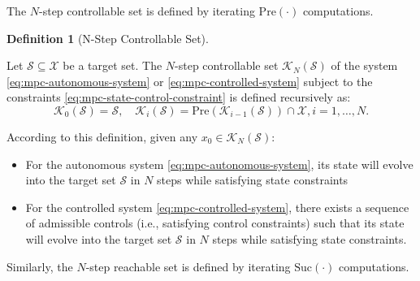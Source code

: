 \documentclass[
]{book}
\theoremstyle{definition}
\newtheorem{definition}{Definition}[chapter]
\theoremstyle{definition}
\theoremstyle{definition}
\theoremstyle{definition}
\theoremstyle{remark}
\begin{document}
The \(N\)-step controllable set is defined by iterating \(\text{Pre}(\cdot)\) computations.

\begin{definition}[N-Step Controllable Set]
\protect\hypertarget{def:controllable-set}{}\label{def:controllable-set}

Let \(\mathcal{S} \subseteq \mathcal{X}\) be a target set. The \(N\)-step controllable set \(\mathcal{K}_{N}(\mathcal{S})\) of the system \eqref{eq:mpc-autonomous-system} or \eqref{eq:mpc-controlled-system} subject to the constraints \eqref{eq:mpc-state-control-constraint} is defined recursively as:
\[
\mathcal{K}_0 (\mathcal{S}) = \mathcal{S}, \quad \mathcal{K}_{i}(\mathcal{S}) = \text{Pre}(\mathcal{K}_{i-1}(\mathcal{S})) \cap \mathcal{X}, i=1,\dots,N.
\]

According to this definition, given any \(x_0 \in \mathcal{K}_N(\mathcal{S})\):

\begin{itemize}
\item
  For the autonomous system \eqref{eq:mpc-autonomous-system}, its state will evolve into the target set \(\mathcal{S}\) in \(N\) steps while satisfying state constraints
\item
  For the controlled system \eqref{eq:mpc-controlled-system}, there exists a sequence of admissible controls (i.e., satisfying control constraints) such that its state will evolve into the target set \(\mathcal{S}\) in \(N\) steps while satisfying state constraints.
\end{itemize}

\end{definition}

Similarly, the \(N\)-step reachable set is defined by iterating \(\text{Suc}(\cdot)\) computations.
\end{document}
